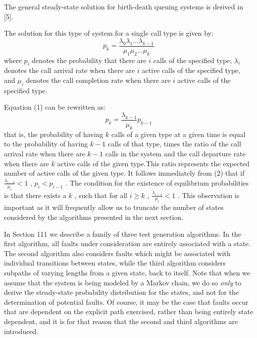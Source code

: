 \documentclass[journal, twoside]{IEEEtran}
\begin{document}
The general steady-state solution for birth-death queuing
systems is derived in [5]. 

The solution for this type of system for a single call type is given by: 
\begin{equation}
    p_k = \frac{\lambda_0\lambda_1...\lambda_{k-1}}{\mu_1\mu_2...\mu_k}
\end{equation}
where \(p_i\) denotes the probability that there are \(i\) calls of the specified type, \(\lambda_i\) denotes the call arrival rate when there are \(i\) active calls of the specified type, and \(\mu_i\) denotes the call
completion rate when there are \(i\) active calls of the specified type.

Equation (1) can be rewritten as: 
\begin{equation}
    p_k=\frac{\lambda_{k-1} }{\mu_k} p_{k-1}
\end{equation}
that is, the probability of having \(k\)  calls of a given type at a given time is equal to the probability of having \(k - 1\) calls of that type, times the ratio of the call arrival rate when there are \(k - 1\) calls in the system and the call departure rate when there are \(k\) active calls of the given type.This ratio represents the
expected number of active calls of the given type. It follows
immediately from (2) that if  $ \frac{\lambda_{i-1}}{\mu_i}<1 $   , $  p_i < p_{i-1} $ . The condition for the existence of equilibrium probabilities is that
there exists a $k$ , such that for all   $ i \geq k $ , $ \frac{\lambda_{i-1}}{\mu_i}<1 $ . This observation is important as it will frequently allow us to truncate the
number of states considered by the algorithms presented in the next section.

In Section 111 we describe a family of three test generation
algorithms. In the first algorithm, all faults under consideration
are entirely associated with a state. The second algorithm also
considers faults which might be associated with individual
transitions between states, while the third algorithm considers
subpaths of varying lengths from a given state, back to itself.
Note that when we assume that the system is being modeled by
a Markov chain, we do so \textit{only} to derive the steady-state probability distribution for the states, and not for the determination
of potential faults. Of course, it may be the case that faults
occur that are dependent on the explicit path exercised, rather
than being entirely state dependent, and it is for that reason
that the second and third algorithms are introduced.
\end{document}
